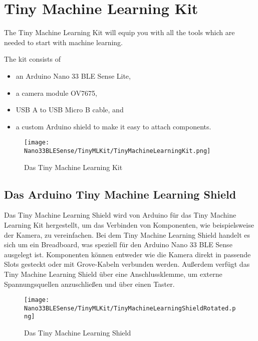 %
%
%


\chapter{Tiny Machine Learning Kit}

The Tiny Machine Learning Kit will equip you with all the tools which are needed to start with machine learning. \cite{ArduinoKit:2022}


The kit consists of

\begin{itemize}
    \item an Arduino Nano 33 BLE Sense Lite,  
    \item a camera module OV7675,
    \item USB A to USB Micro B cable, and 
    \item a custom Arduino shield to make it easy to attach components.
\end{itemize}

\begin{figure}[H]
    \centering
    \texttt{[image: Nano33BLESense/TinyMLKit/TinyMachineLearningKit.png]}
    \caption[Das Tiny Machine Learning Kit]{Das Tiny Machine Learning Kit \cite{ArduinoKit:2022}}
\end{figure}




\section{Das Arduino Tiny Machine Learning Shield}

Das Tiny Machine Learning Shield wird von Arduino für das Tiny Machine Learning Kit hergestellt, um das Verbinden von Komponenten, wie beispielsweise der Kamera, zu vereinfachen. \newline
Bei dem Tiny Machine Learning Shield handelt es sich um ein Breadboard, was speziell für den Arduino Nano 33 BLE Sense ausgelegt ist. Komponenten können entweder wie die Kamera direkt in passende Slots gesteckt oder mit Grove-Kabeln verbunden werden. Außerdem verfügt das Tiny Machine Learning Shield über eine Anschlussklemme, um externe Spannungsquellen anzuschließen und über einen Taster.

\begin{figure}[H]
    \centering
    \texttt{[image: Nano33BLESense/TinyMLKit/TinyMachineLearningShieldRotated.png]}
    \caption[Das Tiny Machine Learning Shield]{Das Tiny Machine Learning Shield \cite{ArduinoKit:2022}}
\end{figure}




